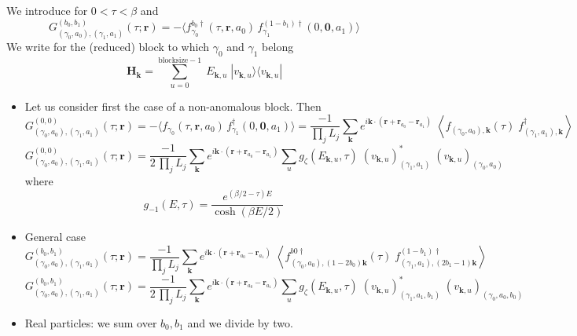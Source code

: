 \documentclass{article}
\begin{document}
We introduce for $0<\tau<\beta$ and 
$$
G_{(\gamma_0,a_0),(\gamma_1,a_1)}^{(b_0,b_1)}(\tau;\mathbf{r}) = -\langle f_{\gamma_0}^{b_0\dagger}(\tau,\mathbf{r},a_0)\,f_{\gamma_1}^{(1-b_1)\dagger}(0,\mathbf{0}, a_1)\rangle 
$$
We write for the (reduced) block to which $\gamma_0$ and $\gamma_1$ belong
$$
\mathbf{H}_{\mathbf{k}}=\sum_{u=0}^{\text{blocksize}-1}\; E_{\mathbf{k},u}\;|v_{\mathbf{k},u}\rangle\langle v_{\mathbf{k},u}| 
$$

\begin{itemize}
\item Let us consider first the case of a non-anomalous block. Then
$$
G_{(\gamma_0,a_0),(\gamma_1,a_1)}^{(0,0)}(\tau;\mathbf{r})=-\langle f_{\gamma_0}(\tau,\mathbf{r},a_0)\,f_{\gamma_1}^{\dagger}(0,\mathbf{0}, a_1)\rangle =\frac{-1}{\prod_j L_j}\sum_{\mathbf{k}}e^{i\mathbf{k}\cdot(\mathbf{r}+\mathbf{r}_{a_0}-\mathbf{r}_{a_1})}\;\left\langle f_{(\gamma_0,a_0),\mathbf{k}}(\tau)\;f^\dagger_{(\gamma_1,a_1),\mathbf{k}}\right\rangle
$$
$$
G_{(\gamma_0,a_0),(\gamma_1,a_1)}^{(0,0)}(\tau;\mathbf{r})=\frac{-1}{2\,\prod_j L_j}\sum_{\mathbf{k}}e^{i\mathbf{k}\cdot(\mathbf{r}+\mathbf{r}_{a_0}-\mathbf{r}_{a_1})} \sum_u g_{\zeta}(E_{\mathbf{k},u}, \tau)\; \left(v_{\mathbf{k},u}\right)_{(\gamma_1,a_1)}^*\; \left(v_{\mathbf{k},u}\right)_{(\gamma_0,a_0)}
$$
where
$$
g_{-1}(E, \tau) = \frac{e^{(\beta/2-\tau) E}}{\cosh(\beta E/2)}
$$
\item General case
  $$
  G_{(\gamma_0,a_0),(\gamma_1,a_1)}^{(b_0,b_1)}(\tau;\mathbf{r})=\frac{-1}{\prod_j L_j}\sum_{\mathbf{k}}e^{i\mathbf{k}\cdot(\mathbf{r}+\mathbf{r}_{a_0}-\mathbf{r}_{a_1})}\;\left\langle f^{b0\dagger}_{(\gamma_0,a_0),(1-2b_0)\mathbf{k}}(\tau)\;f^{(1-b_1)\dagger}_{(\gamma_1,a_1),(2b_1-1)\mathbf{k}}\right\rangle
$$
$$
G_{(\gamma_0,a_0),(\gamma_1,a_1)}^{(b_0,b_1)}(\tau;\mathbf{r})=\frac{-1}{2\,\prod_j L_j}\sum_{\mathbf{k}}e^{i\mathbf{k}\cdot(\mathbf{r}+\mathbf{r}_{a_0}-\mathbf{r}_{a_1})} \sum_u g_\zeta(E_{\mathbf{k},u}, \tau)\; \left(v_{\mathbf{k},u}\right)_{(\gamma_1,a_1,b_1)}^*\; \left(v_{\mathbf{k},u}\right)_{(\gamma_0,a_0,b_0)}
$$
\item Real particles: we sum over $b_0, b_1$ and we divide by two.
\end{itemize}
\end{document}
